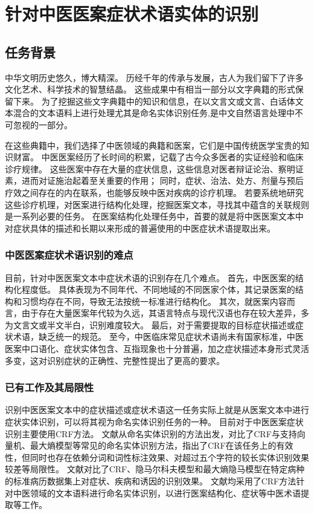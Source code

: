 \chapter{针对中医医案症状术语实体的识别}
\section{任务背景}
中华文明历史悠久，博大精深。
历经千年的传承与发展，古人为我们留下了许多文化艺术、科学技术的智慧结晶。
这些成果中有相当一部分以文字典籍的形式保留下来。
为了挖掘这些文字典籍中的知识和信息，在以文言文或文言、白话体文本混合的文本语料上进行处理尤其是命名实体识别任务,是中文自然语言处理中不可忽视的一部分。

在这些典籍中，我们选择了中医领域的典籍和医案，它们是中国传统医学宝贵的知识财富。
中医医案经历了长时间的积累，记载了古今众多医者的实证经验和临床诊疗规律。
这些医案中存在大量的症状信息，这些信息对医者辩证论治、察明证素，进而对证施治起着至关重要的作用；
同时，症状、治法、处方、剂量与预后疗效之间存在的内在联系，也能够反映中医对疾病的诊疗机理。
若要系统地研究这些诊疗机理，对医案进行结构化处理，挖掘医案文本，寻找其中蕴含的关联规则是一系列必要的任务。
在医案结构化处理任务中，首要的就是将中医医案文本中对症状具体的描述和长期以来形成的普遍使用的中医症状术语提取出来。

\subsection{中医医案症状术语识别的难点}
目前，针对中医医案文本中症状术语的识别存在几个难点。
首先，中医医案的结构化程度低。
具体表现为不同年代、不同地域的不同医家个体，其记录医案的结构和习惯均存在不同，导致无法按统一标准进行结构化。
其次，就医案内容而言，由于存在大量医案年代较为久远，其语言特点与现代汉语也存在较大差异，多为文言文或半文半白，识别难度较大。
最后，对于需要提取的目标症状描述或症状术语，缺乏统一的规范。
至今，中医临床常见症状术语尚未有国家标准，中医医案中口语化、症状实体包含、互指现象也十分普遍，加之症状描述本身形式灵活多变，这对识别症状的正确性、完整性提出了更高的要求。


\subsection{已有工作及其局限性}
识别中医医案文本中的症状描述或症状术语这一任务实际上就是从医案文本中进行症状实体识别，可以将其视为命名实体识别任务的一种。
目前对于中医医案症状识别主要使用CRF方法。
文献从命名实体识别的方法出发，对比了CRF与支持向量机、最大熵模型等常见的命名实体识别方法，指出了CRF在该任务上的有效性，但同时也存在依赖分词和词性标注效果、对超过五个字符的较长实体识别效果较差等局限性。
文献对比了CRF、隐马尔科夫模型和最大熵隐马模型在特定病种的标准病历数据集上对症状、疾病和诱因的识别效果。
文献均采用了CRF方法针对中医领域的文本语料进行命名实体识别，以进行医案结构化、症状等中医术语提取等工作。

